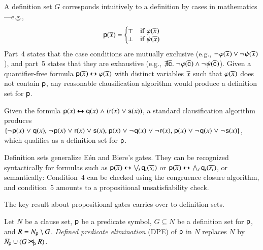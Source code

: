 A definition set $G$ corresponds intuitively to a definition by
cases in mathematics---e.g.,
\[\cst{p}(\tuple{x}{}) =
\begin{cases} \top & \mathrm{if}~\varphi(\tuple{x}{}{}) \\[-\jot]
\bot & \mathrm{if}~\psi(\tuple{x}{})\end{cases}\]
Part~4 states that the case conditions are mutually exclusive
(e.g., $\neglit{\varphi(\tuple{x}{})} \lor \neglit{\psi(\tuple{x}{})}$),
and part~5 states that they are exhaustive
(e.g., $\nexists\tuple{\cst{c}}{} .\; \neglit{\varphi(\tuple{\cst{c}}{})} \land \neglit{\psi(\tuple{\cst{c}}{})}$).
%
Given a quantifier-free formula $\cst{p}(\tuple{x}{}) \medleftrightarrow
\varphi(\tuple{x}{})$ with distinct variables $\tuple{x}{}$ such that
$\varphi(\tuple{x}{})$ does not contain $\cst{p}$, any reasonable
clausification algorithm would produce a definition set for $\cst{p}$.

\begin{exa}
   \label{example:tautologies}
   Given the formula $\cst{p}(x) \medleftrightarrow \cst{q}(x) \mathrel\land
   (\cst{r}(x) \cor \cst{s}(x))$, a standard clausification algorithm
   \cite{nw-01-small-cnf} produces $\{ \negpredlit{\cst{p}(x)} \cor
   \pospredlit{\cst{q}(x)}{,}\; \negpredlit{\cst{p}(x)} \cor
   \pospredlit{\cst{r}(x)} \cor \pospredlit{\cst{s}(x)}{,}\;
   \pospredlit{\cst{p}(x)} \cor \negpredlit{\cst{q}(x)} \cor
   \negpredlit{\cst{r}(x)}{,}\; \pospredlit{\cst{p}(x)} \cor
   \negpredlit{\cst{q}(x)} \cor \negpredlit{\cst{s}(x)}\}$, which qualifies
   as a definition set for $\cst{p}$.
\end{exa}

Definition sets generalize E{\'{e}}n and Biere's
gates. They can be recognized syntactically for formulas such as
$\cst{p}(\tuple{x}{}) \medleftrightarrow \bigvee_{\!i} \cst{q}_i(\tuple{s_i}{})$ or
$\cst{p}(\tuple{x}{}) \medleftrightarrow \bigwedge_i \cst{q}_i(\tuple{s_i}{})$,
or semantically: Condition~4 can be checked
using the congruence closure algorithm, and condition~5 amounts to
a propositional unsatisfiability check.

The key result about propositional gates carries over to definition sets.

\begin{defi}
   Let $N$ be a clause set, $\cst{p}$ be a predicate symbol,
   $G \subseteq N$ be a definition set
   for $\cst{p}$, and $R = \withpred{N}{\cst{p}}
   \setminus G$. \emph{Defined predicate elimination} (DPE) of $\cst{p}$ in $N$ replaces $N$ by
   $\withoutpred{N}{\cst{p}} \cup
   (\confrep{\withpred{G}{\cst{p}}}{G} \flatres_{\!\cst{p}} \confrep{\withpred{R}{\cst{p}}}{R})$.
\end{defi}

